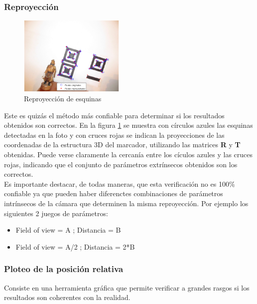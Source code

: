 \subsubsection*{Reproyección}

\begin{figure}
	\begin{center}
	\vspace{-20pt}
		\includegraphics[width=0.45\textwidth]{./pics_camara/resultado_rp.png}
	\end{center}
	\caption{Reproyección de esquinas}
	\label{fig:resultado_rp}
\end{figure}

Este es quizás el método más confiable para determinar si los resultados obtenidos son correctos. En la figura \ref{fig:resultado_rp} se muestra con círculos azules las esquinas detectadas en la foto y con cruces rojas se indican la proyecciones de las coordenadas de la estructura 3D del marcador, utilizando las matrices \textbf{R} y \textbf{T} obtenidas. Puede verse claramente la cercanía entre los cículos azules y las cruces rojas, indicando que el conjunto de parámetros extrínsecos obtenidos son los correctos.\\

Es importante destacar, de todas maneras, que esta verificación no es 100\% confiable ya que pueden haber diferenctes combinaciones de parámetros intrínsecos de la cámara que determinen la misma reproyección. Por ejemplo los siguientes 2 juegos de parámetros:
\begin{itemize}
\item Field of view = A   ; Distancia = B
\item Field of view = A/2 ; Distancia = 2*B
\end{itemize}

\subsubsection*{Ploteo de la posición relativa}

Consiste en una herramienta gráfica que permite verificar a grandes rasgos si los resultados son coherentes con la realidad.\\
 
